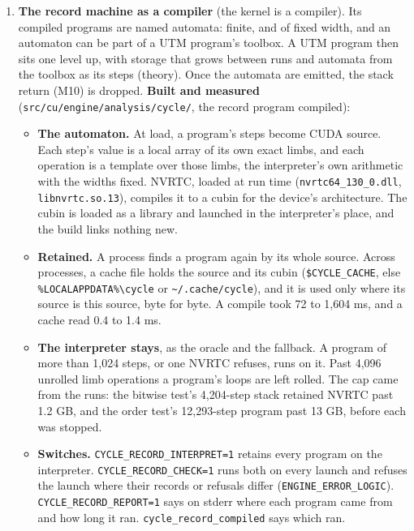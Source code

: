 \begin{enumerate}
\item \textbf{The record machine as a compiler} (the kernel is a compiler). Its compiled programs are named automata: finite, and of fixed width, and an automaton can be part of a UTM program's toolbox. A UTM program then sits one level up, with storage that grows between runs and automata from the toolbox as its steps (theory). Once the automata are emitted, the stack return (M10) is dropped. \textbf{Built and measured} (\texttt{src/\allowbreak{}cu/\allowbreak{}engine/\allowbreak{}analysis/\allowbreak{}cycle/\allowbreak{}}, the record program compiled):

\begin{itemize}
\item \textbf{The automaton.} At load, a program's steps become CUDA source. Each step's value is a local array of its own exact limbs, and each operation is a template over those limbs, the interpreter's own arithmetic with the widths fixed. NVRTC, loaded at run time (\texttt{nvrtc64\_\allowbreak{}130\_\allowbreak{}0.\allowbreak{}dll}, \texttt{libnvrtc.\allowbreak{}so.\allowbreak{}13}), compiles it to a cubin for the device's architecture. The cubin is loaded as a library and launched in the interpreter's place, and the build links nothing new.
\item \textbf{Retained.} A process finds a program again by its whole source. Across processes, a cache file holds the source and its cubin (\texttt{\$CYCLE\_\allowbreak{}CACHE}, else \texttt{\%LOCALAPPDATA\%\textbackslash{}cycle} or \texttt{\textasciitilde{}/\allowbreak{}.\allowbreak{}cache/\allowbreak{}cycle}), and it is used only where its source is this source, byte for byte. A compile took 72 to 1,604 ms, and a cache read 0.4 to 1.4 ms.
\item \textbf{The interpreter stays}, as the oracle and the fallback. A program of more than 1,024 steps, or one NVRTC refuses, runs on it. Past 4,096 unrolled limb operations a program's loops are left rolled. The cap came from the runs: the bitwise test's 4,204-step stack retained NVRTC past 1.2 GB, and the order test's 12,293-step program past 13 GB, before each was stopped.
\item \textbf{Switches.} \texttt{CYCLE\_\allowbreak{}RECORD\_\allowbreak{}INTERPRET=1} retains every program on the interpreter. \texttt{CYCLE\_\allowbreak{}RECORD\_\allowbreak{}CHECK=1} runs both on every launch and refuses the launch where their records or refusals differ (\texttt{ENGINE\_\allowbreak{}ERROR\_\allowbreak{}LOGIC}). \texttt{CYCLE\_\allowbreak{}RECORD\_\allowbreak{}REPORT=1} says on stderr where each program came from and how long it ran. \texttt{cycle\_\allowbreak{}record\_\allowbreak{}compiled} says which ran.

\end{itemize}
\end{enumerate}
